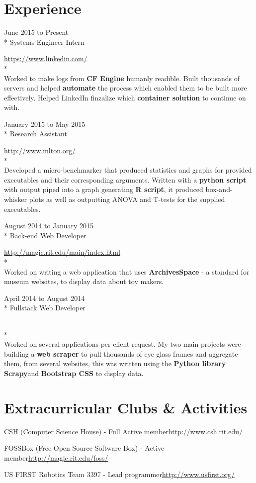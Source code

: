 \documentclass[a4paper,margin,line]{resume}
\newcommand{\rurl}[1]{\hfill {\footnotesize \url{#1}}}
\newcommand{\rdate}[1]{\hfill {\small #1}}
\newcommand{\rproject}[4]{\item[#1] \hfill \rdate{#2} \\* \hfill \rdate{#3} \strut\hfill \rurl{#4} \\*}
\begin{document}
\begin{resume}
\section{\mysidestyle Experience}
	\begin{asparadesc}
        \rproject{LinkedIn}{June 2015 to Present}{Systems Engineer Intern}{https://www.linkedin.com/}
        \\
        \small
        Worked to make logs from {\bf CF Engine} humanly readible. Built thousands of servers and helped {\bf automate}
        the process which enabled them to be built more effectively. Helped LinkedIn finzalize which {\bf container 
        solution} to continue on with.
        \normalsize
        \\
        \rproject{Golisano College of Computing and Informational Sciences}{January 2015 to May 2015}{Research Assistant}{http://www.mlton.org/} 
        \\
        \small
        Developed a micro-benchmarker that produced statistics and graphs for provided executables
        and their corresponding arguments. Written with a {\bf python script} with output piped into
        a graph generating {\bf R script}, it produced box-and-whisker plots as well as outputting ANOVA and
        T-tests for the supplied executables.
        \normalsize
        \\
        \rproject{Media Arts Games Interaction and Creativity Center at RIT}{August 2014 to January 2015}{Back-end Web Developer}{http://magic.rit.edu/main/index.html}
		\small
        \\
        Worked on writing a web application that uses {\bf ArchivesSpace} - a
        standard for museum websites, to display data about toy makers.\normalsize
        \\
        \rproject{Earth Moves}{April 2014 to August 2014}{Fullstack Web Developer}{}
        \\
		\small
        Worked on several applications per client request. My two main projects
        were building a {\bf web scraper} to pull thousands of eye glass frames and
        aggregate them, from several websites, this was written using the {\bf Python
        library Scrapy}and {\bf Bootstrap CSS} to display data.
    \end{asparadesc}
\section{\mysidestyle Extracurricular Clubs \& Activities}
	\begin{asparablank}
    \item CSH ({\small Computer Science House}) - {\small Full Active member}\rurl{http://www.csh.rit.edu/}
    \item FOSSBox ({\small Free Open Source Software Box}) - {\small Active member}\rurl{http://magic.rit.edu/foss/}
    \item US FIRST Robotics Team 3397 - {\small Lead programmer}\rurl{http://www.usfirst.org/}
	\end{asparablank}

\end{resume}
\end{document}
